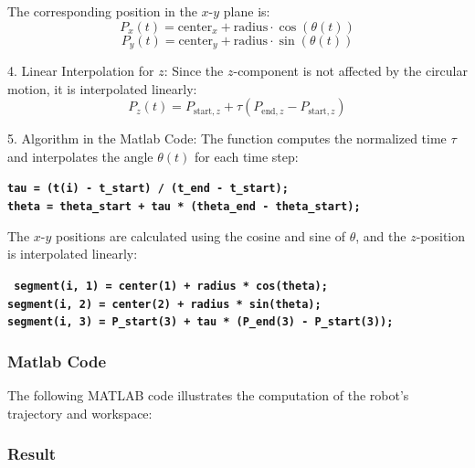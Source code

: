 \documentclass[12pt]{report}
\begin{document}
	The corresponding position in the \(x\)-\(y\) plane is:
\begin{equation}
	P_x(t) = \text{center}_x + \text{radius} \cdot \cos(\theta(t))
\end{equation}
\begin{equation}
	P_y(t) = \text{center}_y + \text{radius} \cdot \sin(\theta(t))
\end{equation}

	4. Linear Interpolation for \(z\):
	Since the \(z\)-component is not affected by the circular motion, it is interpolated linearly:
\begin{equation}
	P_z(t) = P_{\text{start},z} + \tau (P_{\text{end},z} - P_{\text{start},z})
\end{equation}

	
	5. Algorithm in the Matlab Code:
	The function computes the normalized time \(\tau\) and interpolates the angle \(\theta(t)\) for each time step:
	
\begin{center}
	\textbf{\texttt{tau = (t(i) - t\_start) / (t\_end - t\_start); \\
			theta = theta\_start + tau * (theta\_end - theta\_start);}}
\end{center}

	
	The \(x\)-\(y\) positions are calculated using the cosine and sine of \(\theta\), and the \(z\)-position is interpolated linearly:
	
	\begin{center}
		\textbf{\texttt{
				segment(i, 1) = center(1) + radius * cos(theta); \\
				segment(i, 2) = center(2) + radius * sin(theta); \\
				segment(i, 3) = P\_start(3) + tau * (P\_end(3) - P\_start(3));}}
	\end{center}
	\subsubsection{Matlab Code}
	The following MATLAB code illustrates the computation of the robot's trajectory and workspace:
	

	
	\subsubsection{Result}
	
\end{document}
